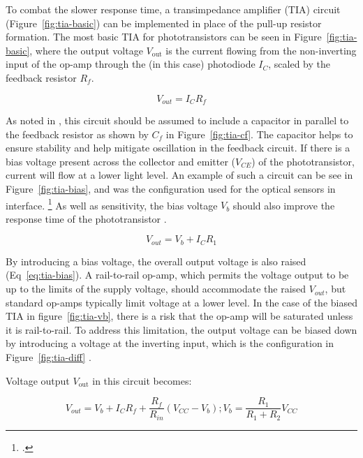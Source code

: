 To combat the slower response time, a transimpedance amplifier (TIA) circuit
(Figure~\ref{fig:tia-basic}) can be implemented in place of the pull-up resistor
formation. The most basic TIA for phototransistors can be seen in
Figure~\ref{fig:tia-basic}, where the output voltage $V_{\text{out}}$ is the
current flowing from the non-inverting input of the op-amp through the (in this
case) photodiode $I_{C}$, scaled by the feedback resistor $R_{f}$.

\begin{equation}
    V_{out} = I_{C}R_{f}
\end{equation}

As noted in \textcite[p.~233]{horowitz_art_2015}, this circuit should be assumed
to include a capacitor in parallel to the feedback resistor as shown by $C_f$ in
Figure~\ref{fig:tia-cf}. The capacitor helps to ensure stability and help
mitigate oscillation in the feedback circuit. If there is a bias voltage present
across the collector and emitter ($V_{CE}$) of the phototransistor, current will
flow at a lower light level. An example of such a circuit can be see in
Figure~\ref{fig:tia-bias}, and was the configuration used for the optical
sensors in \citep{pardue_near_2013} interface. \footnote{\textcite[Figure
        3]{pardue_near_2013}.} As well as sensitivity, the bias voltage $V_{b}$ should
also improve the response time of the phototransistor
\cite{falco_understanding_2023}.

\begin{equation}\label{eq:tia-bias}
    V_{out} = V_{b} + I_{C}R_{1}
\end{equation}

By introducing a bias voltage, the overall output voltage is also raised
(Eq~\ref{eq:tia-bias}). A rail-to-rail op-amp, which permits the voltage output
to be up to the limits of the supply voltage, should accommodate the raised
$V_{out}$, but standard op-amps typically limit voltage at a lower level. In the
case of the biased TIA in figure~\ref{fig:tia-vb}, there is a risk that the
op-amp will be saturated unless it is rail-to-rail. To address this limitation,
the output voltage can be biased down by introducing a voltage at the inverting
input, which is the configuration in Figure~\ref{fig:tia-diff}
\cite{mcpherson_portable_2013}.

Voltage output $V_{\text{out}}$ in this circuit becomes:

\begin{equation}
    V_{out} = V_{b} + I_{C}R_{f} + \frac{R_f}{R_{in}}(V_{CC} - V_{b}); V_{b} = \frac{R_1}{R_1+R_2}V_{CC}
\end{equation}

